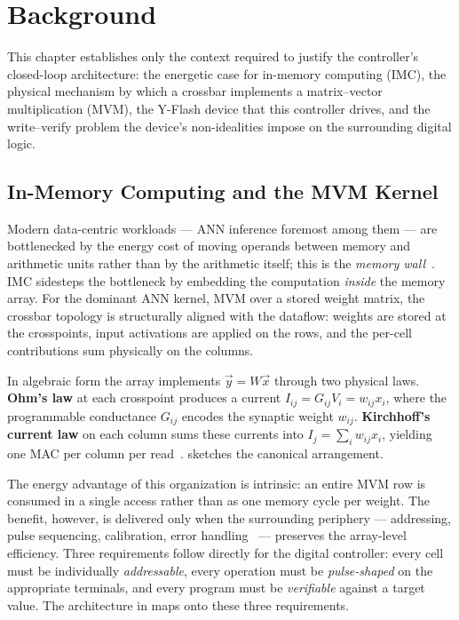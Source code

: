 
\chapter{Background}
\label{ch:background}

This chapter establishes only the context required to justify the
controller's closed-loop architecture: the energetic case for in-memory
computing (IMC), the physical mechanism by which a crossbar implements a
matrix--vector multiplication (MVM), the Y-Flash device that this controller
drives, and the write--verify problem the device's non-idealities impose on
the surrounding digital logic.

\section{In-Memory Computing and the MVM Kernel}
\label{sec:bg-imc}

Modern data-centric workloads --- ANN inference foremost among them --- are
bottlenecked by the energy cost of moving operands between memory and
arithmetic units rather than by the arithmetic itself; this is the
\emph{memory wall}~\cite{Sebastian2020IMC, Ielmini2018RRAM, Verma2019IMC}.
IMC sidesteps the bottleneck by embedding the computation \emph{inside} the
memory array. For the dominant ANN kernel, MVM over a stored weight
matrix, the crossbar topology is structurally aligned with the dataflow:
weights are stored at the crosspoints, input activations are applied on
the rows, and the per-cell contributions sum physically on the columns.

In algebraic form the array implements $\vec{y} = W\vec{x}$ through two
physical laws. \textbf{Ohm's law} at each crosspoint produces a current
$I_{ij} = G_{ij}V_i = w_{ij}x_i$, where the programmable conductance
$G_{ij}$ encodes the synaptic weight $w_{ij}$. \textbf{Kirchhoff's current
law} on each column sums these currents into
$I_j = \sum_i w_{ij}x_i$, yielding one MAC per column per
read~\cite{Sebastian2020IMC, Verma2019IMC, Ielmini2018RRAM}.
 sketches the canonical arrangement.

The energy advantage of this organization is intrinsic: an entire MVM row
is consumed in a single access rather than as one memory cycle per weight.
The benefit, however, is delivered only when the surrounding periphery ---
addressing, pulse sequencing, calibration, error
handling~\cite{Sebastian2020IMC} --- preserves the array-level efficiency.
Three requirements follow directly for the digital controller: every cell
must be individually \emph{addressable}, every operation must be
\emph{pulse-shaped} on the appropriate terminals, and every program must
be \emph{verifiable} against a target value. The architecture in
 maps onto these three requirements.

